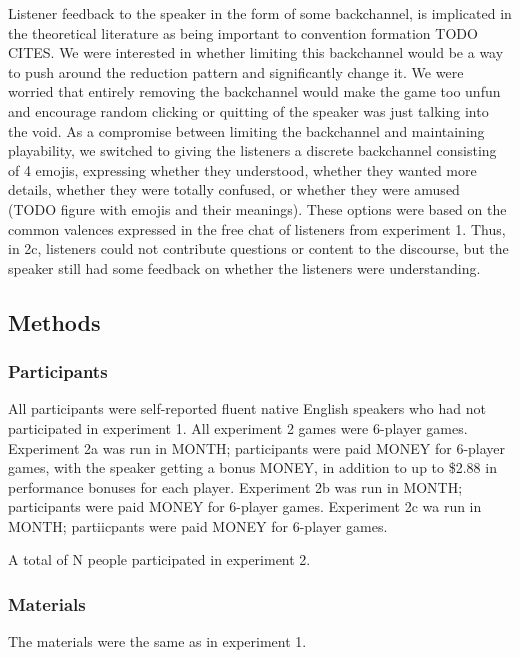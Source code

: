 \documentclass[
  english,
  a4paper,
]{article}
\begin{document}
Listener feedback to the speaker in the form of some backchannel, is implicated in the theoretical literature as being important to convention formation TODO CITES. We were interested in whether limiting this backchannel would be a way to push around the reduction pattern and significantly change it. We were worried that entirely removing the backchannel would make the game too unfun and encourage random clicking or quitting of the speaker was just talking into the void. As a compromise between limiting the backchannel and maintaining playability, we switched to giving the listeners a discrete backchannel consisting of 4 emojis, expressing whether they understood, whether they wanted more details, whether they were totally confused, or whether they were amused (TODO figure with emojis and their meanings). These options were based on the common valences expressed in the free chat of listeners from experiment 1. Thus, in 2c, listeners could not contribute questions or content to the discourse, but the speaker still had some feedback on whether the listeners were understanding.

\hypertarget{methods-1}{%
\subsection{Methods}\label{methods-1}}

\hypertarget{participants-1}{%
\subsubsection{Participants}\label{participants-1}}

All participants were self-reported fluent native English speakers who had not participated in experiment 1.
All experiment 2 games were 6-player games.
Experiment 2a was run in MONTH; participants were paid MONEY for 6-player games, with the speaker getting a bonus MONEY, in addition to up to \$2.88 in performance bonuses for each player.
Experiment 2b was run in MONTH; participants were paid MONEY for 6-player games.
Experiment 2c wa run in MONTH; partiicpants were paid MONEY for 6-player games.

A total of N people participated in experiment 2.

\hypertarget{materials-1}{%
\subsubsection{Materials}\label{materials-1}}

The materials were the same as in experiment 1.
\end{document}
